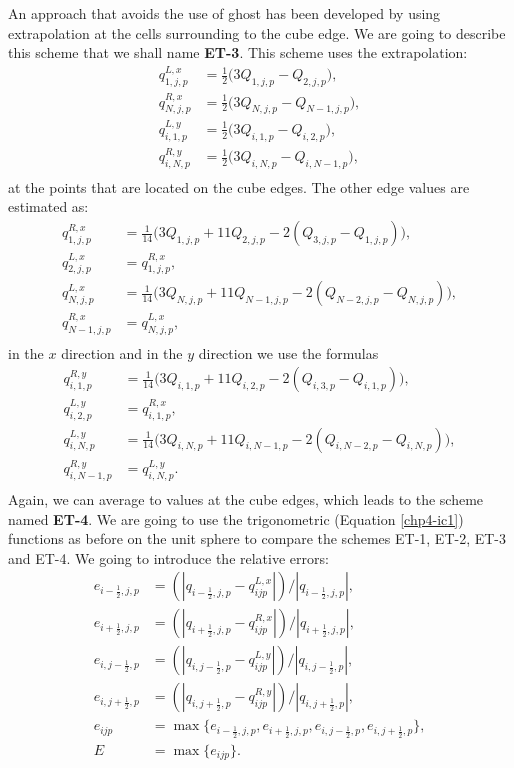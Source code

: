 An approach that avoids the use of ghost has been developed by \citet{putman:2007} using 
extrapolation at the cells surrounding to the cube edge.
We are going to describe this scheme that we shall name \textbf{ET-3}. This scheme uses the extrapolation:
\begin{align*}
	q^{L,x}_{1,j,p} &= \frac{1}{2}\bigg(3Q_{1,j,p} - Q_{2,j,p}\bigg),\\
	q^{R,x}_{N,j,p} &= \frac{1}{2}\bigg(3Q_{N,j,p} - Q_{N-1,j,p}\bigg),\\
	q^{L,y}_{i,1,p} &= \frac{1}{2}\bigg(3Q_{i,1,p} - Q_{i,2,p}\bigg),\\
	q^{R,y}_{i,N,p} &= \frac{1}{2}\bigg(3Q_{i,N,p} - Q_{i,N-1,p}\bigg),\\
\end{align*}
at the points that are located on the cube edges. The other edge values are estimated as:
\begin{align*}
	q^{R,x}_{1,j,p} &= \frac{1}{14}\bigg(3Q_{1,j,p} + 11Q_{2,j,p} - 2(Q_{3,j,p} - Q_{1,j,p})\bigg),\\
	q^{L,x}_{2,j,p} &= q^{R,x}_{1,j,p},\\
	q^{L,x}_{N,j,p} &= \frac{1}{14}\bigg(3Q_{N,j,p} + 11Q_{N-1,j,p} - 2(Q_{N-2,j,p} - Q_{N,j,p})\bigg),\\
	q^{R,x}_{N-1,j,p} &= q^{L,x}_{N,j,p},\\
\end{align*}
in the $x$ direction and in the $y$ direction we use the formulas
\begin{align*}
	q^{R,y}_{i,1,p} &= \frac{1}{14}\bigg(3Q_{i,1,p} + 11Q_{i,2,p} - 2(Q_{i,3,p} - Q_{i,1,p})\bigg),\\
	q^{L,y}_{i,2,p} &= q^{R,x}_{i,1,p},\\
	q^{L,y}_{i,N,p} &= \frac{1}{14}\bigg(3Q_{i,N,p} + 11Q_{i,N-1,p} - 2(Q_{i,N-2,p} - Q_{i,N,p})\bigg),\\
	q^{R,y}_{i,N-1,p} &= q^{L,y}_{i,N,p}.\\
\end{align*}
Again, we can average to values at the cube edges, which leads to the scheme named \textbf{ET-4}.
We are going to use the trigonometric (Equation \eqref{chp4-ic1}) functions
as before on the unit sphere to compare the schemes ET-1, ET-2, ET-3 and ET-4.
We going to introduce the relative errors:
\begin{align*}
	e_{{i-\frac{1}{2}},j,p} &= (|q_{{i-\frac{1}{2}},j,p} - q^{L,x}_{ijp}|)/|q_{{i-\frac{1}{2}},j,p}|,\\
	e_{{i+\frac{1}{2}},j,p} &= (|q_{{i+\frac{1}{2}},j,p} - q^{R,x}_{ijp}|)/|q_{{i+\frac{1}{2}},j,p}|,\\
	e_{i,{j-\frac{1}{2}},p} &= (|q_{i,{j-\frac{1}{2}},p} - q^{L,y}_{ijp}|)/|q_{i,{j-\frac{1}{2}},p}|,\\
	e_{i,{j+\frac{1}{2}},p} &= (|q_{i,{j+\frac{1}{2}},p} - q^{R,y}_{ijp}|)/|q_{i,{j+\frac{1}{2}},p}|,\\
	e_{ijp} &= \max\{e_{{i-\frac{1}{2}},j,p}, e_{{i+\frac{1}{2}},j,p} , e_{i,{j-\frac{1}{2}},p}, e_{i,{j+\frac{1}{2}},p} \},\\
	E &= \max \{e_{ijp}\}.
\end{align*}
